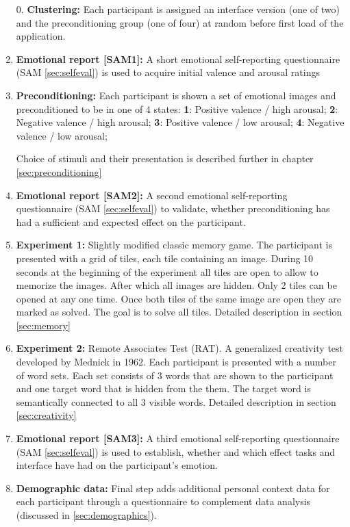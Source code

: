 	\begin{enumerate}
		
		\item[0.] \textbf{Clustering:} Each participant is assigned an interface version (one of two) and the preconditioning group (one of four) at random before first load of the application.
		
		\item \textbf{Emotional report [SAM1]:} A short emotional self-reporting questionnaire (SAM \ref{sec:selfeval}) is used to acquire initial valence and arousal ratings
		
		\item \textbf{Preconditioning:} Each participant is shown a set of emotional images and preconditioned to be in one of 4 states:
			\textbf{1}: Positive valence / high arousal;
			\textbf{2}: Negative valence / high arousal;
			\textbf{3}: Positive valence / low arousal;
			\textbf{4}: Negative valence / low arousal;
			
		Choice of stimuli and their presentation is described further in chapter \ref{sec:preconditioning}
			
		\item \textbf{Emotional report [SAM2]:} A second emotional self-reporting questionnaire (SAM \ref{sec:selfeval}) to validate, whether preconditioning has had a sufficient and expected effect on the participant.
		
		\item \textbf{Experiment 1:} Slightly modified classic memory game. The participant is presented with a grid of tiles, each tile containing an image. During 10 seconds at the beginning of the experiment all tiles are open to allow to memorize the images. After which all images are hidden. Only 2 tiles can be opened at any one time. Once both tiles of the same image are open they are marked as solved. The goal is to solve all tiles. Detailed description in section \ref{sec:memory}
		
		\item \textbf{Experiment 2:} Remote Associates Test (RAT). A generalized creativity test developed by Mednick \cite{Mednick1962} in 1962. Each participant is presented with a number of word sets. Each set consists of 3 words that are shown to the participant and one target word that is hidden from the them. The target word is semantically connected to all 3 visible words. Detailed description in section \ref{sec:creativity}
		
		\item \textbf{Emotional report [SAM3]:} A third emotional self-reporting questionnaire (SAM \ref{sec:selfeval}) is used to establish, whether and which effect tasks and interface have had on the participant's emotion.
		
		\item \textbf{Demographic data:} Final step adds additional personal context data for each participant through a questionnaire to complement data analysis (discussed in \ref{sec:demographics}).
		
	\end{enumerate}
	
